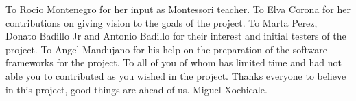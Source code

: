 \documentclass[sigconf]{acmart}
\begin{document}
\begin{acks}
To Rocio Montenegro for her input as Montessori teacher. To Elva Corona for her contributions on giving vision to the goals of the project. 
To Marta Perez, Donato Badillo Jr and Antonio Badillo for their interest and initial testers of the project. 
To Angel Mandujano for his help on the preparation of the software frameworks for the project. 
To all of you of whom has limited time and had not able you to contributed as you wished in the project.
Thanks everyone to believe in this project, good things are ahead of us. Miguel Xochicale.
\end{acks}



\end{document}
